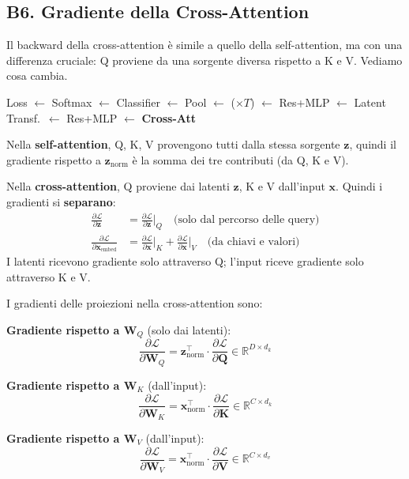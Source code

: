 \documentclass[12pt,a4paper]{article}
\begin{document}
\subsection{B6. Gradiente della Cross-Attention} \label{sec:grad_ca}

Il backward della cross-attention \`e simile a quello della self-attention, ma con una differenza cruciale: Q proviene da una sorgente diversa rispetto a K e V. Vediamo cosa cambia.

\begin{pipelinebox}[title={\small Backward --- Passo corrente evidenziato}]
Loss $\leftarrow$ Softmax $\leftarrow$ Classifier $\leftarrow$ Pool $\leftarrow$ ($\times T$) $\leftarrow$ Res+MLP $\leftarrow$ Latent Transf.\ $\leftarrow$ Res+MLP $\leftarrow$ \textbf{Cross-Att}
\end{pipelinebox}

\begin{formulabox}
Nella \textbf{self-attention}, Q, K, V provengono tutti dalla stessa sorgente $\mathbf{z}$, quindi il gradiente rispetto a $\mathbf{z}_{\text{norm}}$ \`e la somma dei tre contributi (da Q, K e V).

Nella \textbf{cross-attention}, Q proviene dai latenti $\mathbf{z}$, K e V dall'input $\mathbf{x}$. Quindi i gradienti si \textbf{separano}:
\begin{align*}
    \frac{\partial \mathcal{L}}{\partial \mathbf{z}} &= \frac{\partial \mathcal{L}}{\partial \mathbf{z}}\bigg|_Q \quad \text{(solo dal percorso delle query)} \\[4pt]
    \frac{\partial \mathcal{L}}{\partial \mathbf{x}_{\text{embed}}} &= \frac{\partial \mathcal{L}}{\partial \mathbf{x}}\bigg|_K + \frac{\partial \mathcal{L}}{\partial \mathbf{x}}\bigg|_V \quad \text{(da chiavi e valori)}
\end{align*}
I latenti ricevono gradiente solo attraverso Q; l'input riceve gradiente solo attraverso K e V.
\end{formulabox}

\begin{formulabox}
I gradienti delle proiezioni nella cross-attention sono:

\textbf{Gradiente rispetto a $\mathbf{W}_Q$} (solo dai latenti):
\[
    \frac{\partial \mathcal{L}}{\partial \mathbf{W}_Q} = \mathbf{z}_{\text{norm}}^\top \cdot \frac{\partial \mathcal{L}}{\partial \mathbf{Q}} \in \mathbb{R}^{D \times d_k}
\]

\textbf{Gradiente rispetto a $\mathbf{W}_K$} (dall'input):
\[
    \frac{\partial \mathcal{L}}{\partial \mathbf{W}_K} = \mathbf{x}_{\text{norm}}^\top \cdot \frac{\partial \mathcal{L}}{\partial \mathbf{K}} \in \mathbb{R}^{C \times d_k}
\]

\textbf{Gradiente rispetto a $\mathbf{W}_V$} (dall'input):
\[
    \frac{\partial \mathcal{L}}{\partial \mathbf{W}_V} = \mathbf{x}_{\text{norm}}^\top \cdot \frac{\partial \mathcal{L}}{\partial \mathbf{V}} \in \mathbb{R}^{C \times d_v}
\]
\end{formulabox}
\end{document}

